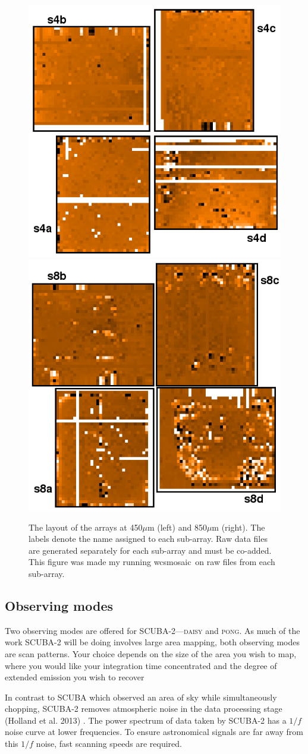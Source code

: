 \documentclass[twoside,11pt]{article}
\newcommand{\xref}[3]{#1}
\newcommand{\xlabel}[1]{}
\renewcommand{\_}{\texttt{\symbol{95}}}
\newcommand{\task}[1]{\textsf{#1}}
\newcommand{\wcsmosaic}{\xref{\task{wcsmosaic}}{sun95}{WCSMOSAIC}}
\begin{document}
\begin{figure}[t!]
\begin{center}
\includegraphics[width=0.4\linewidth]{sc21_450array}
\hspace{1cm}
\includegraphics[width=0.4\linewidth]{sc21_850array}
\label{fig:arrays}
\caption[The physical layout of the arrays at each wavelength]{
  \small The layout of the arrays at 450$\mu$m (left) and
  850$\mu$m (right). The labels denote the name assigned to each
  sub-array. Raw data files are generated separately for each sub-array
  and must be co-added. This figure was made my running \wcsmosaic\ on
  raw files from each sub-array.
}
\end{center}
\end{figure}

\subsection{\xlabel{obs_modes}Observing modes}
\label{sec:mmodes}

Two observing modes are offered for SCUBA-2---\textsc{daisy} and
\textsc{pong}. As much of the work SCUBA-2 will be doing involves
large area mapping, both observing modes are scan patterns. Your
choice depends on the size of the area you wish to map, where you
would like your integration time concentrated and the degree of
extended emission you wish to recover

In contrast to SCUBA which observed an area of sky while
simultaneously chopping, SCUBA-2 removes atmospheric noise in the data
processing stage (Holland et al. 2013) \cite{s2main}. The power spectrum
of data taken by SCUBA-2 has a $1/f$ noise curve at lower frequencies. To
ensure astronomical signals are far away from this $1/f$ noise, fast
scanning speeds are required.
\end{document}
